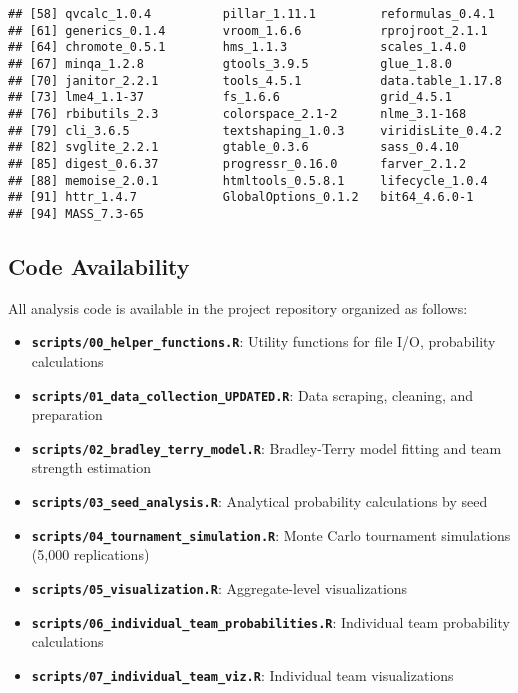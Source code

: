 \documentclass[
]{article}
\providecommand{\tightlist}{%
  \setlength{\itemsep}{0pt}\setlength{\parskip}{0pt}}
\begin{document}
\begin{verbatim}
## [58] qvcalc_1.0.4          pillar_1.11.1         reformulas_0.4.1     
## [61] generics_0.1.4        vroom_1.6.6           rprojroot_2.1.1      
## [64] chromote_0.5.1        hms_1.1.3             scales_1.4.0         
## [67] minqa_1.2.8           gtools_3.9.5          glue_1.8.0           
## [70] janitor_2.2.1         tools_4.5.1           data.table_1.17.8    
## [73] lme4_1.1-37           fs_1.6.6              grid_4.5.1           
## [76] rbibutils_2.3         colorspace_2.1-2      nlme_3.1-168         
## [79] cli_3.6.5             textshaping_1.0.3     viridisLite_0.4.2    
## [82] svglite_2.2.1         gtable_0.3.6          sass_0.4.10          
## [85] digest_0.6.37         progressr_0.16.0      farver_2.1.2         
## [88] memoise_2.0.1         htmltools_0.5.8.1     lifecycle_1.0.4      
## [91] httr_1.4.7            GlobalOptions_0.1.2   bit64_4.6.0-1        
## [94] MASS_7.3-65
\end{verbatim}

\subsection{Code Availability}\label{code-availability}

All analysis code is available in the project repository organized as
follows:

\begin{itemize}
\tightlist
\item
  \textbf{\texttt{scripts/00\_helper\_functions.R}}: Utility functions
  for file I/O, probability calculations
\item
  \textbf{\texttt{scripts/01\_data\_collection\_UPDATED.R}}: Data
  scraping, cleaning, and preparation
\item
  \textbf{\texttt{scripts/02\_bradley\_terry\_model.R}}: Bradley-Terry
  model fitting and team strength estimation
\item
  \textbf{\texttt{scripts/03\_seed\_analysis.R}}: Analytical probability
  calculations by seed
\item
  \textbf{\texttt{scripts/04\_tournament\_simulation.R}}: Monte Carlo
  tournament simulations (5,000 replications)
\item
  \textbf{\texttt{scripts/05\_visualization.R}}: Aggregate-level
  visualizations
\item
  \textbf{\texttt{scripts/06\_individual\_team\_probabilities.R}}:
  Individual team probability calculations
\item
  \textbf{\texttt{scripts/07\_individual\_team\_viz.R}}: Individual team
  visualizations
\end{itemize}
\end{document}
